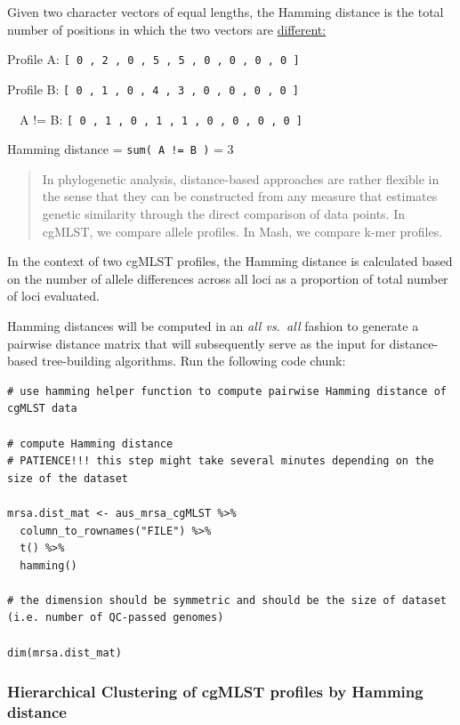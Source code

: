 \documentclass[
]{book}
\begin{document}
Given two character vectors of equal lengths, the Hamming distance is the total number of positions in which the two vectors are \ul{different:}

Profile A: \texttt{{[}\ 0\ ,\ 2\ ,\ 0\ ,\ 5\ ,\ 5\ ,\ 0\ ,\ 0\ ,\ 0\ ,\ 0\ {]}}

Profile B: \texttt{{[}\ 0\ ,\ 1\ ,\ 0\ ,\ 4\ ,\ 3\ ,\ 0\ ,\ 0\ ,\ 0\ ,\ 0\ {]}}

~~A != B: \texttt{{[}\ 0\ ,\ 1\ ,\ 0\ ,\ 1\ ,\ 1\ ,\ 0\ ,\ 0\ ,\ 0\ ,\ 0\ {]}} ~~

Hamming distance = \texttt{sum(\ A\ !=\ B\ )} = 3

\begin{quote}
In phylogenetic analysis, distance-based approaches are rather flexible in the sense that they can be constructed from any measure that estimates genetic similarity through the direct comparison of data points. In cgMLST, we compare allele profiles. In Mash, we compare k-mer profiles.
\end{quote}

In the context of two cgMLST profiles, the Hamming distance is calculated based on the number of allele differences across all loci as a proportion of total number of loci evaluated.

Hamming distances will be computed in an \emph{all vs.~all} fashion to generate a pairwise distance matrix that will subsequently serve as the input for distance-based tree-building algorithms. Run the following code chunk:

\begin{verbatim}
# use hamming helper function to compute pairwise Hamming distance of cgMLST data 

# compute Hamming distance 
# PATIENCE!!! this step might take several minutes depending on the size of the dataset

mrsa.dist_mat <- aus_mrsa_cgMLST %>% 
  column_to_rownames("FILE") %>% 
  t() %>% 
  hamming()

# the dimension should be symmetric and should be the size of dataset (i.e. number of QC-passed genomes)

dim(mrsa.dist_mat)

\end{verbatim}

\subsubsection{Hierarchical Clustering of cgMLST profiles by Hamming distance}\label{hierarchical-clustering-of-cgmlst-profiles-by-hamming-distance}
\end{document}
